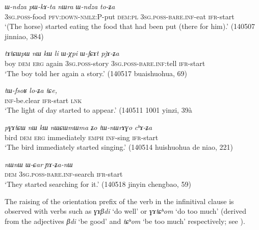 \documentclass[oneside,a4paper,11pt]{article}
\newcommand{\ipa}[1]{\textit{\phon#1}}
\newcommand{\jpg}[2]{\ipa{#1} `#2'}
\begin{document}
\begin{exe}
\ex \label{ex:toZa}
\gll \ipa{ɯ-ndza} 	\ipa{pɯ-kɤ-ta} 	\ipa{nɯra} 	\ipa{ɯ-ndza} 	\ipa{to-ʑa} \\
\textsc{3sg.poss}-food \textsc{pfv:down-nmlz:P}-put \textsc{dem:pl} \textsc{3sg.poss-bare.inf}-eat \textsc{ifr}-start \\
\glt `(The horse) started eating the food that had been put (there for him).' (140507 jinniao, 384)
\end{exe}

\begin{exe}
\ex \label{ex:pjAZa}
\gll
\ipa{tɤtɕɯpɯ} 	\ipa{nɯ} 	\ipa{kɯ} 	\ipa{li} \ipa{ɯ-χpi} 	\ipa{ɯ-fɕɤt} 	\ipa{pjɤ-ʑa} \\
boy \textsc{dem} \textsc{erg} again \textsc{3sg.poss}-story \textsc{3sg.poss-bare.inf}:tell \textsc{ifr}-start \\
\glt `The boy told her again a story.' (140517 buaishuohua, 69)
\end{exe}

\begin{exe}
\ex \label{ex:loZa}
\gll
\ipa{tɯ-fsoʁ} 	\ipa{lo-ʑa} 	\ipa{tɕe,} \\
\textsc{inf}-be.clear \textsc{ifr}-start \textsc{lnk} \\
\glt `The light of day started to appear.' (140511 1001 yinzi, 39à
\end{exe}

\begin{exe}
\ex \label{ex:chAZa}
\gll \ipa{pɣɤtɕɯ} 	\ipa{nɯ} 	\ipa{kɯ} 	\ipa{nɯɕɯmɯma} 	\ipa{ʑo} 	\ipa{tɯ-nɯrɤɣo} 	\ipa{cʰɤ-ʑa} \\
bird \textsc{dem} \textsc{erg} immediately \textsc{emph} \textsc{inf}-sing \textsc{ifr}-start \\
\glt `The bird immediately started singing.' (140514 huishuohua de niao, 221)
\end{exe}

\begin{exe}
\ex \label{ex:YAZa}
\gll
\ipa{nɯnɯ} 	\ipa{ɯ-ɕar} 	\ipa{ɲɤ-ʑa-nɯ} \\
\textsc{dem} \textsc{3sg.poss-bare.inf}-search \textsc{ifr}-start \\
\glt `They started searching for it.' (140518 jinyin chengbao, 59)
\end{exe}

The raising of the orientation prefix of the verb in the infinitival clause is observed with verbs such as \jpg{ɣɤβdi}{do well} or \jpg{ɣɤtɕʰom}{do too much} (derived from the adjectives \jpg{βdi}{be good} and \jpg{tɕʰom}{be too much} respectively; see \citealt[184]{jacques15causative}).
\end{document}
